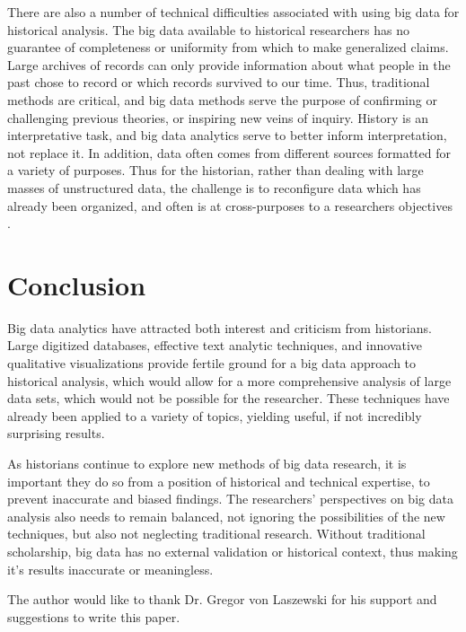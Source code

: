 \documentclass[sigconf]{acmart}
\begin{document}
There are also a number of technical difficulties associated with using big data for historical analysis. The big data available to historical researchers has no guarantee of completeness or uniformity from which to make generalized claims. Large archives of records can only provide information about what people in the past chose to record or which records survived to our time. Thus, traditional methods are critical, and big data methods serve the purpose of confirming or challenging previous theories, or inspiring new veins of inquiry. History is an interpretative task, and big data analytics serve to better inform interpretation, not replace it. In addition, data often comes from different sources formatted for a variety of purposes. Thus for the historian, rather than dealing with large masses of unstructured data, the challenge is to reconfigure data which has already been organized, and often is at cross-purposes to a researchers objectives \cite{digitalrepublicletters}.

\section{Conclusion}

Big data analytics have attracted both interest and criticism from historians. Large digitized databases, effective text analytic techniques, and innovative qualitative visualizations provide fertile ground for a big data approach to historical analysis, which would allow for a more comprehensive analysis of large data sets, which would not be possible for the researcher. These techniques have already been applied to a variety of topics, yielding useful, if not incredibly surprising results. 

As historians continue to explore new methods of big data research, it is important they do so from a position of historical and technical expertise, to prevent inaccurate and biased findings. The researchers' perspectives on big data analysis also needs to remain balanced, not ignoring the possibilities of the new techniques, but also not neglecting traditional research. Without traditional scholarship, big data has no external validation or historical context, thus making it's results inaccurate or meaningless.

\begin{acks}

  The author would like to thank Dr. Gregor von Laszewski for his
  support and suggestions to write this paper.

\end{acks}


 
\end{document}
